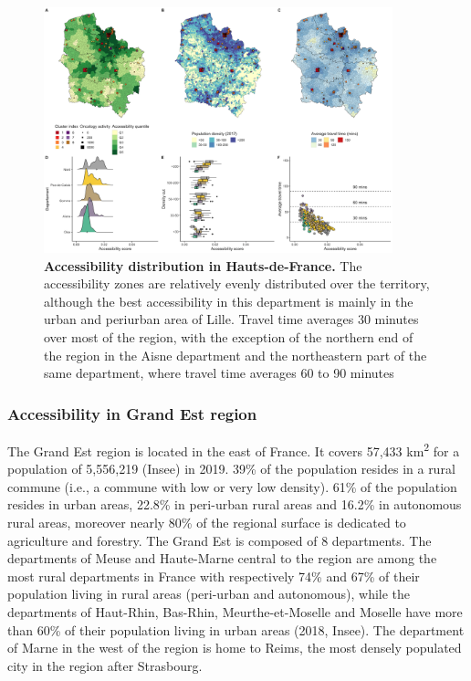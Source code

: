 \begin{figure}[h!]
    \includegraphics[width=0.9\textwidth]{images/camion/region_accessibility/accessibility_Hauts-de-France.png}
    \centering
    \caption{ \textbf{Accessibility distribution in Hauts-de-France.} The
        accessibility zones are relatively evenly distributed over the
        territory, although the best accessibility in this department is mainly
        in the urban and periurban area of Lille. Travel time averages 30
        minutes over most of the region, with the exception of the northern end
        of the region in the Aisne department and the northeastern part of the
        same department, where travel time averages 60 to 90 minutes }
\end{figure}

\subsubsection{Accessibility in Grand Est region}

The Grand Est region is located in the east of France. It covers 57,433
km\textsuperscript{2} for a population of 5,556,219 (Insee) in 2019. 39\% of the
population resides in a rural commune (i.e., a commune with low or very low
density). 61\% of the population resides in urban areas, 22.8\% in peri-urban
rural areas and 16.2\% in autonomous rural areas, moreover nearly 80\% of the
regional surface is dedicated to agriculture and forestry. The Grand Est is
composed of 8 departments. The departments of Meuse and Haute-Marne central to
the region are among the most rural departments in France with respectively 74\%
and 67\% of their population living in rural areas (peri-urban and autonomous),
while the departments of Haut-Rhin, Bas-Rhin, Meurthe-et-Moselle and Moselle
have more than 60\% of their population living in urban areas (2018, Insee). The
department of Marne in the west of the region is home to Reims, the most densely
populated city in the region after Strasbourg.

